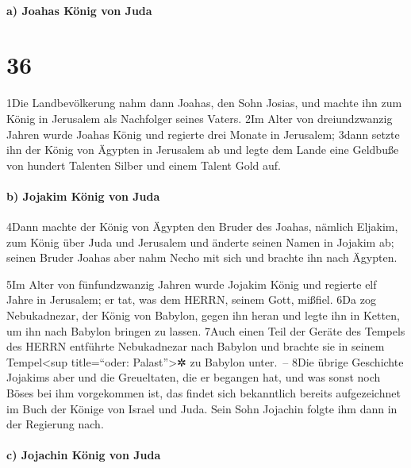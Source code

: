 \hypertarget{a-joahas-kuxf6nig-von-juda}{%
\paragraph{a) Joahas König von Juda}\label{a-joahas-kuxf6nig-von-juda}}

\hypertarget{section-35}{%
\section{36}\label{section-35}}

1Die Landbevölkerung nahm dann Joahas, den Sohn Josias, und machte ihn
zum König in Jerusalem als Nachfolger seines Vaters. 2Im Alter von
dreiundzwanzig Jahren wurde Joahas König und regierte drei Monate in
Jerusalem; 3dann setzte ihn der König von Ägypten in Jerusalem ab und
legte dem Lande eine Geldbuße von hundert Talenten Silber und einem
Talent Gold auf.

\hypertarget{b-jojakim-kuxf6nig-von-juda}{%
\paragraph{b) Jojakim König von
Juda}\label{b-jojakim-kuxf6nig-von-juda}}

4Dann machte der König von Ägypten den Bruder des Joahas, nämlich
Eljakim, zum König über Juda und Jerusalem und änderte seinen Namen in
Jojakim ab; seinen Bruder Joahas aber nahm Necho mit sich und brachte
ihn nach Ägypten.

5Im Alter von fünfundzwanzig Jahren wurde Jojakim König und regierte elf
Jahre in Jerusalem; er tat, was dem HERRN, seinem Gott, mißfiel. 6Da zog
Nebukadnezar, der König von Babylon, gegen ihn heran und legte ihn in
Ketten, um ihn nach Babylon bringen zu lassen. 7Auch einen Teil der
Geräte des Tempels des HERRN entführte Nebukadnezar nach Babylon und
brachte sie in seinem Tempel\textless sup title=``oder:
Palast''\textgreater✲ zu Babylon unter.~-- 8Die übrige Geschichte
Jojakims aber und die Greueltaten, die er begangen hat, und was sonst
noch Böses bei ihm vorgekommen ist, das findet sich bekanntlich bereits
aufgezeichnet im Buch der Könige von Israel und Juda. Sein Sohn Jojachin
folgte ihm dann in der Regierung nach.

\hypertarget{c-jojachin-kuxf6nig-von-juda}{%
\paragraph{c) Jojachin König von
Juda}\label{c-jojachin-kuxf6nig-von-juda}}

